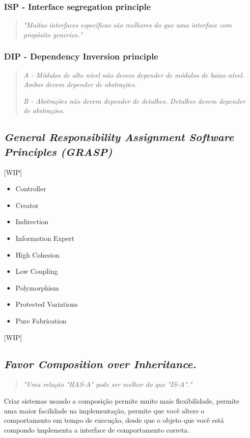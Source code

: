 \documentclass[12pt]{article}
\begin{document}
\subsubsection{ISP - Interface segregation principle}
\begin{quote}
	\textit{"Muitas interfaces específicas são melhores do que uma interface com propósito generico."}	
\end{quote}
\subsubsection{DIP - Dependency Inversion principle}
\begin{quote}
	\textit{A - Módulos de alto nível não devem depender de módulos de baixo nível. Ambos devem depender de abstrações.}
	
	\textit{B -  Abstrações não devem depender de detalhes. Detalhes devem depender de abstrações.}	
\end{quote}

\subsection{\textit{General Responsibility Assignment Software Principles (GRASP)}} \label{sec:grasp}
[WIP]
\begin{itemize}
	\item Controller	
	\item Creator
	\item Indirection
	\item Information Expert
	\item High Cohesion
	\item Low Coupling
	\item Polymorphism
	\item Protected Variations
	\item Pure Fabrication
\end{itemize}
[WIP]

\subsection{\textit{Favor Composition over Inheritance.}} \label{sec:favor_composition}
\begin{quote}
\textit{"Uma relação "HAS-A" pode ser melhor do que "IS-A"."}\cite{HEADFIRST_DESIGN_PATTERN}
\end{quote}

Criar sistemas usando a composição permite muito mais flexibilidade, permite uma maior facilidade na implementação, permite que você altere o comportamento em tempo de execução, desde que o objeto que você está compondo implementa a interface de comportamento correta. 
\end{document}
